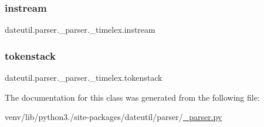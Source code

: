 \subsubsection{\texorpdfstring{instream}{instream}}
{\footnotesize\ttfamily dateutil.\+parser.\+\_\+parser.\+\_\+timelex.\+instream}

\mbox{\label{classdateutil_1_1parser_1_1__parser_1_1__timelex_af10b9463d37ac42cf2fa2e8de0e88897}} 
\subsubsection{\texorpdfstring{tokenstack}{tokenstack}}
{\footnotesize\ttfamily dateutil.\+parser.\+\_\+parser.\+\_\+timelex.\+tokenstack}



The documentation for this class was generated from the following file\+:\begin{DoxyCompactItemize}
\item 
venv/lib/python3./site-\/packages/dateutil/parser/\hyperlink{dateutil_2parser_2__parser_8py}{\+\_\+parser.\+py}\end{DoxyCompactItemize}
